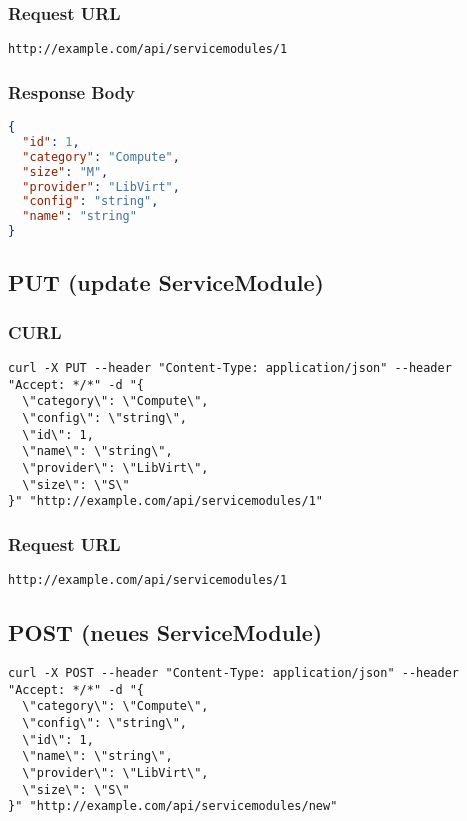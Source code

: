 \subsubsection{Request URL}
\begin{lstlisting}[] 
http://example.com/api/servicemodules/1
\end{lstlisting}


\subsubsection{Response Body}
\begin{lstlisting}[language=json] 
{
  "id": 1,
  "category": "Compute",
  "size": "M",
  "provider": "LibVirt",
  "config": "string",
  "name": "string"
}
\end{lstlisting}

\newpage
\subsection{PUT (update ServiceModule)}
\subsubsection{CURL}
\begin{lstlisting}[] 
curl -X PUT --header "Content-Type: application/json" --header "Accept: */*" -d "{
  \"category\": \"Compute\",
  \"config\": \"string\",
  \"id\": 1,
  \"name\": \"string\",
  \"provider\": \"LibVirt\",
  \"size\": \"S\"
}" "http://example.com/api/servicemodules/1"
\end{lstlisting}


\subsubsection{Request URL}
\begin{lstlisting}[] 
http://example.com/api/servicemodules/1
\end{lstlisting}

\subsection{POST (neues ServiceModule)}
\begin{lstlisting}[] 
curl -X POST --header "Content-Type: application/json" --header "Accept: */*" -d "{
  \"category\": \"Compute\",
  \"config\": \"string\",
  \"id\": 1,
  \"name\": \"string\",
  \"provider\": \"LibVirt\",
  \"size\": \"S\"
}" "http://example.com/api/servicemodules/new"
\end{lstlisting}


